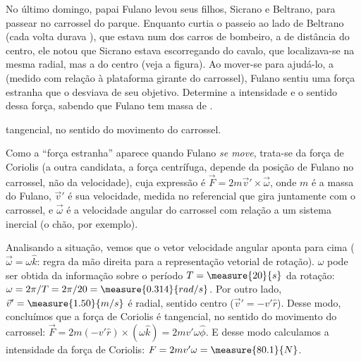 \begin{question}
	No último domingo, papai Fulano levou seus filhos, Sicrano e Beltrano, para passear no carrossel do parque.
	Enquanto curtia o passeio ao lado de Beltrano (cada volta durava ), que estava num dos carros de bombeiro, a  de distância do centro, ele notou que Sicrano estava escorregando do cavalo, que localizava-se na mesma radial, mas a  do centro (veja a figura).
	Ao mover-se para ajudá-lo, a  (medido com relação à plataforma girante do carrossel), Fulano sentiu uma força estranha que o desviava de seu objetivo.
	Determine a intensidade e o sentido dessa força, sabendo que Fulano tem massa de .

	\begin{answer}
		 tangencial, no sentido do movimento do carrossel.
	\end{answer}


	\begin{solution}
		Como a ``força estranha'' aparece quando Fulano \emph{se move}, trata-se da força de Coriolis (a outra candidata, a força centrífuga, depende da posição de Fulano no carrossel, não da velocidade), cuja expressão é $\vec F = 2m\vec v' \times \vec \omega$, onde $m$ é a massa do Fulano, $\vec v'$ é sua velocidade, medida no referencial que gira juntamente com o carrossel, e $\vec\omega$ é a velocidade angular do carrossel com relação a um sistema inercial (o chão, por exemplo).

		Analisando a situação, vemos que o vetor velocidade angular aponta para cima ($\vec\omega = \omega\hat k$: regra da mão direita para a representação vetorial de rotação). $\omega$ pode ser obtida da informação sobre o período $T = \measure{20}{s}$ da rotação: $\omega = 2\pi/T = 2\pi/20 = \measure{0.314}{rad/s}$. Por outro lado, $\vec v' = \measure{1.50}{m/s}$ é radial, sentido centro ($\vec v' = -v'\hat r$).
		Desse modo, concluímos que a força de Coriolis é tangencial, no sentido do movimento do carrossel: $\vec F = 2m(-v'\hat r)\times(\omega \hat k) = 2mv'\omega \hat \phi$. E desse modo calculamos a intensidade da força de Coriolis: $F = 2mv'\omega = \measure{80.1}{N}$.
	\end{solution}
\end{question}